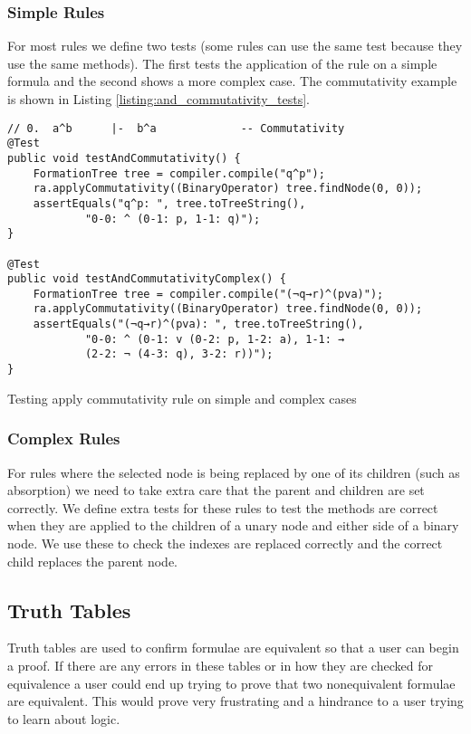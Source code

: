 \documentclass{report}
\begin{document}
\subsubsection{Simple Rules}

For most rules we define two tests (some rules can use the same test because they use the same methods). The first tests the application of the rule on a simple formula and the second shows a more complex case. The commutativity example is shown in Listing \ref{listing:and_commutativity_tests}.

\begin{listing}[ht]
\begin{verbatim}
// 0.  a^b      |-  b^a             -- Commutativity
@Test
public void testAndCommutativity() {
    FormationTree tree = compiler.compile("q^p");
    ra.applyCommutativity((BinaryOperator) tree.findNode(0, 0));
    assertEquals("q^p: ", tree.toTreeString(), 
            "0-0: ^ (0-1: p, 1-1: q)");
}

@Test
public void testAndCommutativityComplex() {
    FormationTree tree = compiler.compile("(¬q→r)^(pva)");
    ra.applyCommutativity((BinaryOperator) tree.findNode(0, 0));
    assertEquals("(¬q→r)^(pva): ", tree.toTreeString(), 
            "0-0: ^ (0-1: v (0-2: p, 1-2: a), 1-1: → 
            (2-2: ¬ (4-3: q), 3-2: r))");
}
\end{verbatim}
\caption{Testing apply commutativity rule on simple and complex cases}
\label{listing:and_commutativity_tests}
\end{listing}

\subsubsection{Complex Rules}

For rules where the selected node is being replaced by one of its children (such as absorption) we need to take extra care that the parent and children are set correctly. We define extra tests for these rules to test the methods are correct when they are applied to the children of a unary node and either side of a binary node. We use these to check the indexes are replaced correctly and the correct child replaces the parent node.

\subsection{Truth Tables}

Truth tables are used to confirm formulae are equivalent so that a user can begin a proof. If there are any errors in these tables or in how they are checked for equivalence a user could end up trying to prove that two nonequivalent formulae are equivalent. This would prove very frustrating and a hindrance to a user trying to learn about logic.
\end{document}
